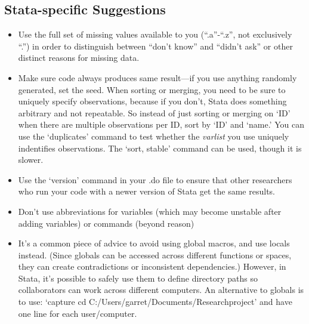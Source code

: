 \documentclass[12pt] {article}
\begin{document}
\subsection{Stata-specific
Suggestions}\label{stata-specific-suggestions}

\begin{itemize}
\item
  Use the full set of missing values available to you (``.a''-``.z'', not exclusively
  ``.'') in order to distinguish between ``don't know'' and ``didn't ask'' or other distinct reasons for missing data.
\item
  Make sure code always produces same result---if you use anything randomly generated, set the seed. When sorting or merging, you need to be sure to uniquely specify observations, because if you don't, Stata does something arbitrary and not repeatable. So instead of just sorting or merging on `ID' when there are multiple observations per ID, sort by `ID' and `name.' You can use the `duplicates' command to test whether the \textit{varlist} you use uniquely indentifies observations. The `sort, stable' command can be used, though it is slower.
\item
  Use the `version' command in your .do file to ensure that other researchers who run your code with a newer version of Stata get the same results. 
\item
  Don't use abbreviations for variables (which may become unstable after
  adding variables) or commands (beyond reason)
\item
  It's a common piece of advice to avoid using global macros, and use locals instead. (Since globals can be accessed across different functions or spaces, they can create contradictions or inconsistent dependencies.) However, in Stata, it's possible to safely use them to define directory paths so collaborators can work across different computers. An alternative to globals is to use: `capture cd C:/Users/garret/Documents/Researchproject' and have one line for each user/computer.
  

\end{itemize}
\end{document}
